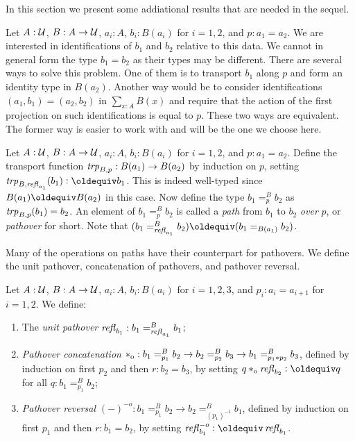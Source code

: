 \documentclass[a4,12pt]{amsart}
\begin{document}
In this section we present some addiational results that are needed in the sequel.

Let $A : \mathcal{U}$, $B : A \to \mathcal{U}$, $a_i:A$, $b_i:B(a_i)$ for $i=1,2$, and $p : a_1 = a_2$.
We are interested in identifications of $b_1$ and $b_2$ relative to this data.
We cannot in general form the type $b_1 = b_2$ as their types may be different.
There are several ways to solve this problem. One of them is to transport $b_1$ along
$p$ and form an identity type in $B(a_2)$. Another way would be to consider
identifications $(a_1,b_1) = (a_2,b_2)$ in $\sum_{x:A} B(x)$ and require that the
action of the first projection on such identifications is equal to $p$. 
These two ways are equivalent.
The former way is easier to work with and will be the one we choose here.

\begin{definition}\label{def:pathover}
Let $A : \mathcal{U}$, $B : A \to \mathcal{U}$, $a_i:A$, $b_i:B(a_i)$ for $i=1,2$, and $p : a_1 = a_2$.
Define the transport function $\mathop{\mathit{trp}_{B,p}} : B(a_1)\to B(a_2)$ by induction on $p$,
setting $\trp{B,\refl{a_1}}(b_1)\defeq b_1$. This is indeed well-typed since
$B(a_1)\jdeq B(a_2)$ in this case.
Now define the type $b_1 =^B_p b_2$ as $\mathop{\mathit{trp}_{B,p}}(b_1) = b_2$.
An element of $b_1 =^B_p b_2$ is called
a \emph{path} from $b_1$ to $b_2$ \emph{over} $p$, or \emph{pathover} for short.
Note that $(b_1 =^B_{\refl{a_1}} b_2) \jdeq (b_1 =_{B(a_1)}  b_2)$.
\end{definition}

Many of the operations on paths have their counterpart for pathovers.
We define the unit pathover, concatenation of pathovers, and pathover reversal.

\begin{definition}\label{def:pathoveralgebra}
Let $A : \mathcal{U}$, $B : A \to \mathcal{U}$, $a_i:A$, $b_i:B(a_i)$ for $i=1,2,3$, and 
$p_i : a_i = a_{i+1}$ for $i=1,2$. We define:
\begin{enumerate}
\item The \emph{unit pathover} $\mathop{{\it refl}_{b_1}} : b_1 =^B_{\mathop{{\it refl}_{a_1}}} b_1$;
\item \emph{Pathover concatenation} $*_{\mathrm{o}} : b_1 =^B_{p_1} b_2 \to
b_2 =^B_{p_2} b_3 \to b_1 =^B_{p_1 * p_2} b_3$, defined by induction
on first $p_2$ and then $r: b_2 = b_3$, by
setting $q \cto \refl{b_2} \defeq q$ for all $q: b_1 =^B_{p_1} b_2$;
\item \emph{Pathover reversal} $({-})^{-o} : b_1 =^B_{p_1} b_2 \to
b_2 =^B_{(p_1)^{-1}} b_1$, defined by induction on first $p_1$ and then $r: b_1 = b_2$, by
setting $\refloi{b_1} \defeq \refl{b_1}$.
\end{enumerate}
\end{definition}
\end{document}

